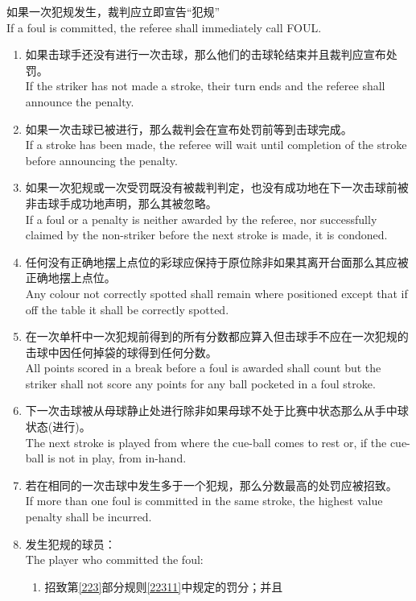 \noindent 如果一次犯规发生，裁判应立即宣告``犯规''\\
If a foul is committed, the referee shall immediately call FOUL.
\begin{enumerate}[label=(\alph*)]
    \item 如果击球手还没有进行一次击球，那么他们的击球轮结束并且裁判应宣布处罚。\\
    If the striker has not made a stroke, their turn ends and the referee shall announce the penalty.
    \item 如果一次击球已被进行，那么裁判会在宣布处罚前等到击球完成。\\
    If a stroke has been made, the referee will wait until completion of the stroke before announcing the penalty.
    \item 如果一次犯规或一次受罚既没有被裁判判定，也没有成功地在下一次击球前被非击球手成功地声明，那么其被忽略。\\
    If a foul or a penalty is neither awarded by the referee, nor successfully claimed by the non-striker before the next stroke is made, it is condoned.
    \item 任何没有正确地摆上点位的彩球应保持于原位除非如果其离开台面那么其应被正确地摆上点位。\\
    Any colour not correctly spotted shall remain where positioned except that if off the table it shall be correctly spotted.
    \item 在一次单杆中一次犯规前得到的所有分数都应算入但击球手不应在一次犯规的击球中因任何掉袋的球得到任何分数。\\
    All points scored in a break before a foul is awarded shall count but the striker shall not score any points for any ball pocketed in a foul stroke.
    \item 下一次击球被从母球静止处进行除非如果母球不处于比赛中状态那么从手中球状态(进行)。\\
    The next stroke is played from where the cue-ball comes to rest or, if the cue-ball is not in play, from in-hand.
    \item 若在相同的一次击球中发生多于一个犯规，那么分数最高的处罚应被招致。\\
    If more than one foul is committed in the same stroke, the highest value penalty shall be incurred.
    \item 发生犯规的球员：\\
    The player who committed the foul:
    \begin{enumerate}[label=(\roman*)]
        \item 招致第\ref{223}部分规则\ref{22311}中规定的罚分；并且\\

\end{enumerate}
\end{enumerate}
